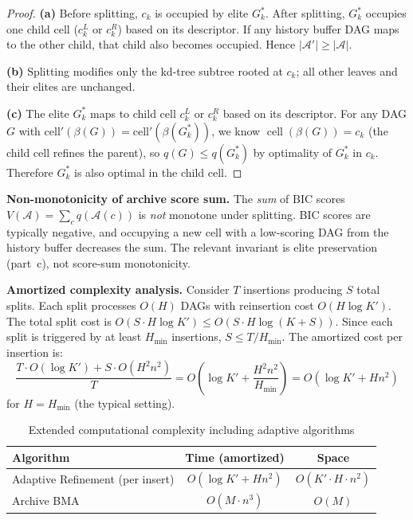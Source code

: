 \documentclass{article}
\theoremstyle{definition}
\theoremstyle{plain}
\theoremstyle{remark}
\DeclareMathOperator{\cell}{cell}
\begin{document}
\begin{proof}
\textbf{(a)} Before splitting, $c_k$ is occupied by elite $G_k^*$. After
splitting, $G_k^*$ occupies one child cell ($c_k^L$ or $c_k^R$) based on
its descriptor. If any history buffer DAG maps to the other child, that
child also becomes occupied. Hence $|\mathcal{A}'| \geq |\mathcal{A}|$.

\textbf{(b)} Splitting modifies only the kd-tree subtree rooted at $c_k$;
all other leaves and their elites are unchanged.

\textbf{(c)} The elite $G_k^*$ maps to child cell
$c_k^{L}$ or $c_k^{R}$ based on its descriptor. For any DAG $G$ with
$\mathrm{cell}'(\beta(G)) = \mathrm{cell}'(\beta(G_k^*))$, we know
$\cell(\beta(G)) = c_k$ (the child cell refines the parent), so
$q(G) \leq q(G_k^*)$ by optimality of $G_k^*$ in $c_k$. Therefore
$G_k^*$ is also optimal in the child cell.
\end{proof}

\textbf{Non-monotonicity of archive score sum.} The \emph{sum} of BIC
scores $V(\mathcal{A}) = \sum_c q(\mathcal{A}(c))$ is \emph{not} monotone
under splitting. BIC scores are typically negative, and occupying a new
cell with a low-scoring DAG from the history buffer decreases the sum.
The relevant invariant is elite preservation (part~c), not score-sum
monotonicity.

\textbf{Amortized complexity analysis.} Consider $T$ insertions producing
$S$ total splits. Each split processes $O(H)$ DAGs with reinsertion cost
$O(H \log K')$. The total split cost is $O(S \cdot H \log K') \leq
O(S \cdot H \log(K + S))$. Since each split is triggered by at least
$H_{\min}$ insertions, $S \leq T / H_{\min}$. The amortized cost per
insertion is:
\begin{equation}
  \frac{T \cdot O(\log K') + S \cdot O(H^2 n^2)}{T}
  = O\!\left(\log K' + \frac{H^2 n^2}{H_{\min}}\right)
  = O(\log K' + H n^2)
\end{equation}
for $H = H_{\min}$ (the typical setting).

\begin{table}[htb]
\centering
\caption{Extended computational complexity including adaptive algorithms}
\label{tab:complexity_extended}
\begin{tabular}{lcc}
\toprule
\textbf{Algorithm} & \textbf{Time (amortized)} & \textbf{Space} \\
\midrule
Adaptive Refinement (per insert) & $O(\log K' + Hn^2)$ & $O(K' \cdot H \cdot n^2)$ \\
Archive BMA & $O(M \cdot n^3)$ & $O(M)$ \\
\bottomrule
\end{tabular}
\end{table}
\end{document}
